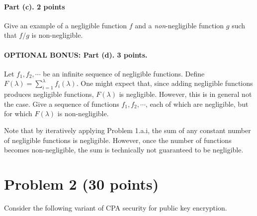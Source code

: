 \documentclass{article}
\begin{document}
\paragraph{Part (c). 2 points} Give an example of a negligible function $f$ and a \emph{non}-negligible function $g$ such that $f/g$ is non-negligible.

\paragraph{OPTIONAL BONUS: Part (d). 3 points.} Let $f_1,f_2,\cdots$ be an infinite sequence of negligible functions. Define $F(\lambda)=\sum_{i=1}^\lambda f_i(\lambda)$. One might expect that, since adding negligible functions produces negligible functions, $F(\lambda)$ is negligible. However, this is in general not the case. Give a sequence of functions $f_1,f_2,\cdots$, each of which are negligible, but for which $F(\lambda)$ is non-negligible.

\begin{remark}Note that by iteratively applying Problem 1.a.i, the sum of any constant number of negligible functions is negligible. However, once the number of functions becomes non-negligible, the sum is technically not guaranteed to be negligible.
\end{remark}




\section{Problem 2 (30 points)}

Consider the following variant of CPA security for public key encryption.
\end{document}
